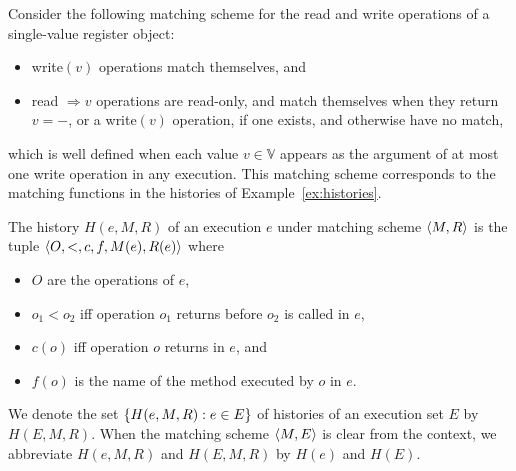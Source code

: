 \begin{example}
  \label{ex:matching}

  Consider the following matching scheme for the read and write operations of
  a single-value register object:
  \begin{itemize}

    \item write$(v)$ operations match themselves, and

    \item read $\Rightarrow v$ operations are read-only, and match themselves
    when they return $v = -$, or a write$(v)$ operation, if one
    exists, and otherwise have no match,
    
  \end{itemize}
  which is well defined when each value $v \in \mathbb{V}$ appears as the
  argument of at most one write operation in any execution. This matching
  scheme corresponds to the matching functions in the histories of
  Example~\ref{ex:histories}.

\end{example}

The history $H(e,M,R)$ of an execution $e$ under matching scheme ${\left\langle{M,R}\right\rangle}$ is
the tuple ${\left\langle{O,<,c,f,M(e),R(e)}\right\rangle}$ where
\begin{itemize}

  \item $O$ are the operations of $e$,

  \item $o_1 < o_2$ if{f} operation $o_1$ returns before $o_2$ is called in $e$,

  \item $c(o)$ if{f} operation $o$ returns in $e$, and

  \item $f(o)$ is the name of the method executed by $o$ in $e$.

\end{itemize}
We denote the set ${\{{H(e,M,R) : e \in E}\}}$ of histories of an execution set
$E$ by $H(E,M,R)$. When the matching scheme ${\left\langle{M,E}\right\rangle}$ is clear from the
context, we abbreviate $H(e,M,R)$ and $H(E,M,R)$ by $H(e)$ and $H(E)$.

